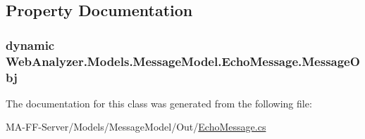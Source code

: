 \subsection{Property Documentation}
\hypertarget{class_web_analyzer_1_1_models_1_1_message_model_1_1_echo_message_a547379308602e0e2a8af2a9790d3e9a4}{}
\subsubsection[{Message\+Obj}]{\setlength{\rightskip}{0pt plus 5cm}dynamic Web\+Analyzer.\+Models.\+Message\+Model.\+Echo\+Message.\+Message\+Obj\hspace{0.3cm}{\ttfamily [get]}}\label{class_web_analyzer_1_1_models_1_1_message_model_1_1_echo_message_a547379308602e0e2a8af2a9790d3e9a4}


The documentation for this class was generated from the following file\+:\begin{DoxyCompactItemize}
\item 
M\+A-\/\+F\+F-\/\+Server/\+Models/\+Message\+Model/\+Out/\hyperlink{_echo_message_8cs}{Echo\+Message.\+cs}\end{DoxyCompactItemize}
